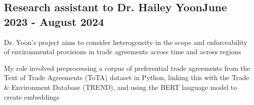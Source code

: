 \documentclass[a4paper, 12pt]{article}
\begin{document}
\subsection {{Research assistant to Dr. Hailey Yoon}\hfill June 2023 - August 2024}
\vspace*{5pt}
\begin{zitemize}
\item Dr. Yoon's project aims to consider heterogeneity in the scope and enforceability of environmental provisions in trade agreements across time and across regions
\medskip
\item My role involved preprocessing a corpus of preferential trade agreements from the Text of Trade Agreements (ToTA) dataset in Python, linking this with the Trade \& Environment Database (TREND), and using the BERT language model to create embeddings

\end{zitemize}
\end{document}
